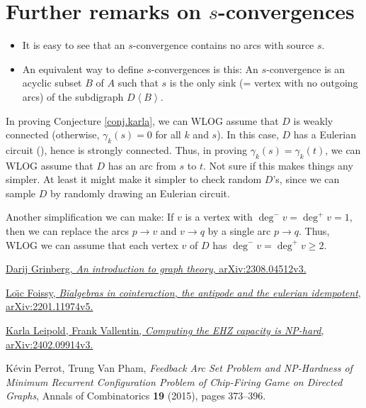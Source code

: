 \documentclass[numbers=enddot,12pt,final,onecolumn,notitlepage]{scrartcl}%
\theoremstyle{definition}
\newenvironment{noncompile}{}{}
\theoremstyle{plainsl}
\begin{document}
\section{Further remarks on $s$-convergences}

\begin{itemize}
\item It is easy to see that an $s$-convergence contains no arcs with source
$s$.

\item An equivalent way to define $s$-convergences is this: An $s$-convergence
is an acyclic subset $B$ of $A$ such that $s$ is the only sink (= vertex with
no outgoing arcs) of the subdigraph $D\left\langle B\right\rangle $.
\end{itemize}

\begin{noncompile}
In proving Conjecture \ref{conj.karla}, we can WLOG assume that $D$ is weakly
connected (otherwise, $\gamma_{k}\left(  s\right)  =0$ for all $k$ and $s$).
In this case, $D$ has a Eulerian circuit (\cite[Theorem 4.7.2]{22s}), hence is
strongly connected. Thus, in proving $\gamma_{k}\left(  s\right)  =\gamma
_{k}\left(  t\right)  $, we can WLOG assume that $D$ has an arc from $s$ to
$t$. Not sure if this makes things any simpler. At least it might make it
simpler to check random $D$'s, since we can sample $D$ by randomly drawing an
Eulerian circuit.

Another simplification we can make: If $v$ is a vertex with $\deg^{-}%
v=\deg^{+}v=1$, then we can replace the arcs $p\rightarrow v$ and
$v\rightarrow q$ by a single arc $p\rightarrow q$. Thus, WLOG we can assume
that each vertex $v$ of $D$ has $\deg^{-}v=\deg^{+}v\geq2$.
\end{noncompile}

\begin{thebibliography}{99999999}                                                                                         %


\href{https://arxiv.org/abs/2308.04512v3}{Darij Grinberg,
\textit{An introduction to graph theory}, arXiv:2308.04512v3.}

%
\href{https://arxiv.org/abs/2201.11974v5}{Lo\"{\i}c Foissy, \textit{Bialgebras
in cointeraction, the antipode and the eulerian idempotent},
arXiv:2201.11974v5.}

\href{https://arxiv.org/abs/2402.09914v3}{Karla
Leipold, Frank Vallentin, \textit{Computing the EHZ capacity is NP-hard},
arXiv:2402.09914v3.}

K\'{e}vin Perrot, Trung Van Pham, \textit{Feedback
Arc Set Problem and NP-Hardness of Minimum Recurrent Configuration Problem of
Chip-Firing Game on Directed Graphs}, Annals of Combinatorics \textbf{19}
(2015), pages 373--396.
\end{thebibliography}
\end{document}
